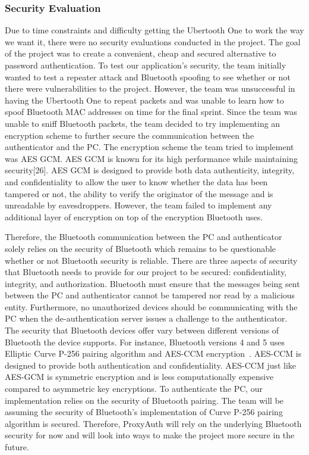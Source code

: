 \documentclass[letterpaper,twocolumn,10pt]{article}
\begin{document}
{{\subsubsection{Security Evaluation}
Due to time constraints and difficulty getting the Ubertooth One to work the way we want it, there were no security evaluations conducted in the project. The goal of the project was to create a convenient, cheap and secured alternative to password authentication. To test our application's security, the team initially wanted to test a repeater attack and Bluetooth spoofing to see whether or not there were vulnerabilities to the project. However, the team was unsuccessful in having the Ubertooth One to repeat packets and was unable to learn how to spoof Bluetooth MAC addresses on time for the final sprint. Since the team was unable to sniff Bluetooth packets, the team decided to try implementing an encryption scheme to further secure the communication between the authenticator and the PC. The encryption scheme the team tried to implement was AES GCM. AES GCM is known for its high performance while maintaining security[26]. AES GCM is designed to provide both data authenticity, integrity, and confidentiality to allow the user to know whether the data has been tampered or not, the ability to verify the originator of the message and is unreadable by eavesdroppers. However, the team failed to implement any additional layer of encryption on top of the encryption Bluetooth uses.

Therefore, the Bluetooth communication between the PC and authenticator solely relies on the security of Bluetooth which remains to be questionable whether or not Bluetooth security is reliable. There are three aspects of security that Bluetooth needs to provide for our project to be secured: confidentiality, integrity, and authorization. Bluetooth must ensure that the messages being sent between the PC and authenticator cannot be tampered nor read by a malicious entity. Furthermore, no unauthorized devices should be communicating with the PC when the de-authentication server issues a challenge to the authenticator. The security that Bluetooth devices offer vary between different versions of Bluetooth the device supports. For instance, Bluetooth versions 4 and 5 uses Elliptic Curve P-256 pairing algorithm and AES-CCM encryption~\cite{bluetooth_security}. AES-CCM is designed to provide both authentication and confidentiality. AES-CCM just like AES-GCM is symmetric encryption and is less computationally expensive compared to asymmetric key encryptions. To authenticate the PC, our implementation relies on the security of Bluetooth pairing. The team will be assuming the security of Bluetooth's implementation of Curve P-256 pairing algorithm is secured. Therefore, ProxyAuth will rely on the underlying Bluetooth security for now and will look into ways to make the project more secure in the future.

}}
\end{document}
